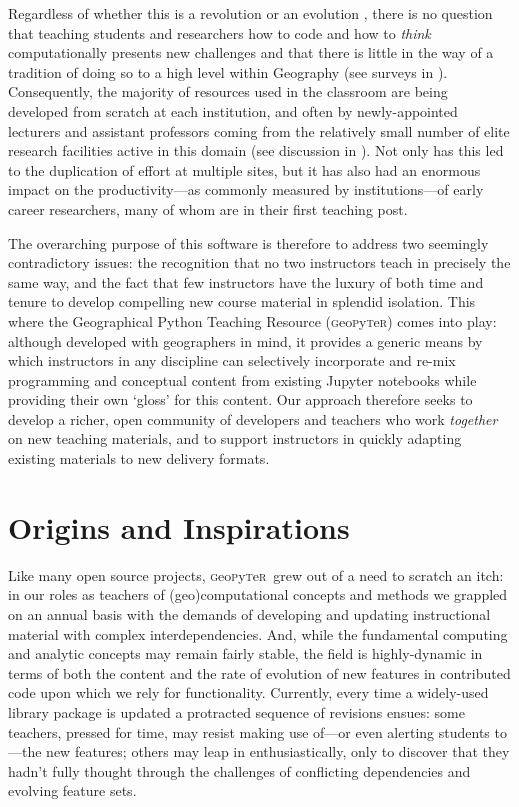 \documentclass[letter, 11pt]{article}
\newcommand{\gp}{\textsc{g}eo\textsc{p}y\textsc{t}e\textsc{r}~\/}
\begin{document}
Regardless of whether this is a revolution \citep{Wyly2014,Torrens2010} or an
evolution \citep{Barnes2013,Barnes2014,ArribasBel2018}, there is no question
that teaching students and researchers how to code and how to \textit{think}
computationally presents new challenges
\citep{Etherington2016,Muller2014,rey_09jgs} and that there is little in the way of a tradition of doing so to a high level within Geography (see surveys in \citealp{Bowlick2017,Bowlick2018}). Consequently, the majority of resources used in the
classroom are being developed from scratch at each institution, and often by
newly-appointed lecturers and assistant professors coming from the relatively
small number of elite research facilities active in this domain (see discussion
in \citealp{esrc2013}). Not only has this led to the duplication of effort at
multiple sites, but it has also had an enormous impact on the productivity---as
commonly measured by institutions---of early career researchers, many of whom
are in their first teaching post.

The overarching purpose of this software is therefore to address two seemingly
contradictory issues: the recognition that no two instructors teach in precisely
the same way, and the fact that few instructors have the luxury of both time and
tenure to develop compelling new course material in splendid isolation. This
where the Geographical Python Teaching Resource
(\textsc{g}eo\textsc{p}y\textsc{t}e\textsc{r}) comes into play: although
developed with geographers in mind, it provides a generic means by which
instructors in any discipline can selectively incorporate and re-mix programming
and conceptual content from existing Jupyter notebooks while providing their own
`gloss' for this content. Our approach therefore seeks to develop a richer, open
community of developers and teachers who work \textit{together} on new teaching
materials, and to support instructors in quickly adapting existing materials to
new delivery formats.

\section{Origins and Inspirations}\label{origins-and-inspirations}

Like many open source projects, \gp grew out of a need to scratch an itch: in
our roles as teachers of (geo)computational concepts and methods we grappled on
an annual basis with the demands of developing and updating instructional
material with complex interdependencies. And, while the fundamental computing
and analytic concepts may remain fairly stable, the field is highly-dynamic in
terms of both the content and the rate of evolution of new features in
contributed code upon which we rely for functionality. Currently, every time a
widely-used library package is updated a protracted sequence of revisions
ensues: some teachers, pressed for time, may resist making use of---or even
alerting students to---the new features; others may leap in enthusiastically,
only to discover that they hadn't fully thought through the challenges of
conflicting dependencies and evolving feature sets.
\end{document}
